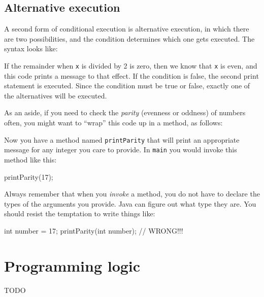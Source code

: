 \documentclass[12pt]{book}
\begin{document}
\subsection{Alternative execution}
\label{alternative}


A second form of conditional execution is alternative execution, in which there are two possibilities, and the condition determines which one gets executed.
The syntax looks like:


If the remainder when {\tt x} is divided by 2 is zero, then we know that {\tt x} is even, and this code prints a message to that effect.
If the condition is false, the second print statement is executed.
Since the condition must be true or false, exactly one of the alternatives will be executed.

As an aside, if you need to check the {\em parity} (evenness or oddness) of numbers often, you might want to ``wrap'' this code up in a method, as follows:


Now you have a method named {\tt printParity} that will print an appropriate message for any integer you care to provide.
In {\tt main} you would invoke this method like this:

\begin{code}
    printParity(17);
\end{code}

Always remember that when you {\em invoke} a method, you do not have to declare the types of the arguments you provide.
Java can figure out what type they are.
You should resist the temptation to write things like:

\begin{code}
    int number = 17;
    printParity(int number);        // WRONG!!!
\end{code}


\section{Programming logic}
TODO
\end{document}
